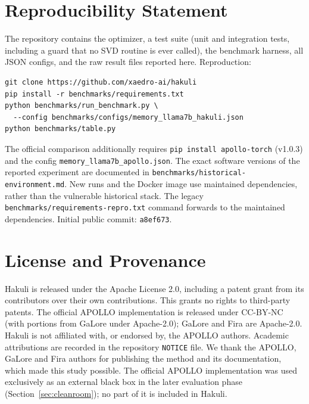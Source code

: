 \documentclass[11pt]{article}
\begin{document}
\section{Reproducibility Statement}
\label{sec:reproducibility}

The repository contains the optimizer, a test suite (unit and integration
tests, including a guard that no SVD routine is ever called), the benchmark
harness, all JSON configs, and the raw result files reported here.
Reproduction:

\begin{verbatim}
git clone https://github.com/xaedro-ai/hakuli
pip install -r benchmarks/requirements.txt
python benchmarks/run_benchmark.py \
  --config benchmarks/configs/memory_llama7b_hakuli.json
python benchmarks/table.py
\end{verbatim}

The official comparison additionally requires \texttt{pip install
apollo-torch} (v1.0.3) and the config
\texttt{memory\_llama7b\_apollo.json}. The exact software versions of the
reported experiment are documented in
\texttt{benchmarks/historical-environment.md}. New runs and the Docker image
use maintained dependencies, rather than the vulnerable historical stack.
The legacy \texttt{benchmarks/requirements-repro.txt} command forwards to
the maintained dependencies.
Initial public commit:
\texttt{a8ef673}.
\section{License and Provenance}
\label{sec:license}

Hakuli is released under the Apache License 2.0, including a patent grant
from its contributors over their own contributions. This grants no rights to
third-party patents. The official APOLLO implementation is released under
CC-BY-NC (with portions from GaLore under Apache-2.0); GaLore and Fira are
Apache-2.0. Hakuli is not affiliated with, or endorsed by, the APOLLO
authors. Academic attributions are recorded in the repository \texttt{NOTICE}
file. We thank the APOLLO, GaLore and Fira authors for publishing the method
and its documentation, which made this study possible. The official APOLLO
implementation was used exclusively as an external black box in the later
evaluation phase (Section~\ref{sec:cleanroom}); no part of it is included in
Hakuli.



\end{document}
